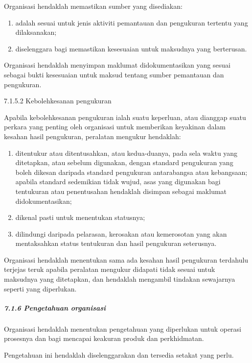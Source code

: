 \documentclass[
]{article}
\begin{document}
Organisasi hendaklah memastikan sumber yang disediakan:

\begin{enumerate}
\def\labelenumi{\alph{enumi})}
\item
  adalah sesuai untuk jenis aktiviti pemantauan dan pengukuran tertentu
  yang dilaksanakan;
\item
  diselenggara bagi memastikan kesesuaian untuk maksudnya yang
  berterusan.
\end{enumerate}

Organisasi hendaklah menyimpan maklumat didokumentasikan yang sesuai
sebagai bukti kesesuaian untuk maksud tentang sumber pemantauan dan
pengukuran.

7.1.5.2 Kebolehkesanan pengukuran

Apabila kebolehkesanan pengukuran ialah suatu keperluan, atau dianggap
suatu perkara yang penting oleh organisasi untuk memberikan keyakinan
dalam kesahan hasil pengukuran, peralatan mengukur hendaklah:

\begin{enumerate}
\def\labelenumi{\alph{enumi})}
\item
  ditentukur atau ditentusahkan, atau kedua-duanya, pada sela waktu yang
  ditetapkan, atau sebelum digunakan, dengan standard pengukuran yang
  boleh dikesan daripada standard pengukuran antarabangsa atau
  kebangsaan; apabila standard sedemikian tidak wujud, asas yang
  digunakan bagi tentukuran atau penentusahan hendaklah disimpan sebagai
  maklumat didokumentasikan;
\item
  dikenal pasti untuk menentukan statusnya;
\item
  dilindungi daripada pelarasan, kerosakan atau kemerosotan yang akan
  mentaksahkan status tentukuran dan hasil pengukuran seterusnya.
\end{enumerate}

Organisasi hendaklah menentukan sama ada kesahan hasil pengukuran
terdahulu terjejas teruk apabila peralatan mengukur didapati tidak
sesuai untuk maksudnya yang ditetapkan, dan hendaklah mengambil tindakan
sewajarnya seperti yang diperlukan.

\hypertarget{pengetahuan-organisasi}{%
\subparagraph{7.1.6 Pengetahuan
organisasi}\label{pengetahuan-organisasi}}

Organisasi hendaklah menentukan pengetahuan yang diperlukan untuk
operasi prosesnya dan bagi mencapai keakuran produk dan perkhidmatan.

Pengetahuan ini hendaklah diselenggarakan dan tersedia setakat yang
perlu.
\end{document}
